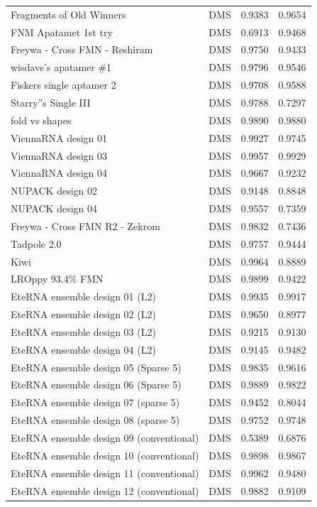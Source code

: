 \documentclass[letter]{bioinfo}
\begin{document}
\begin{center}
\begin{longtable}{lccc}
Fragments of Old Winners	&	DMS	&	0.9383 	&	0.9654 	\\
FNM Apatamet 1st try	&	DMS	&	0.6913 	&	0.9468 	\\
Freywa - Cross FMN - Reshiram	&	DMS	&	0.9750 	&	0.9433 	\\
wisdave's apatamer \#1	&	DMS	&	0.9796 	&	0.9546 	\\
Fiskers single aptamer 2	&	DMS	&	0.9708 	&	0.9588 	\\
Starry''s Single III	&	DMS	&	0.9788 	&	0.7297 	\\
fold vs shapes	&	DMS	&	0.9890 	&	0.9880 	\\
ViennaRNA design 01	&	DMS	&	0.9927 	&	0.9745 	\\
ViennaRNA design 03	&	DMS	&	0.9957 	&	0.9929 	\\
ViennaRNA design 04	&	DMS	&	0.9667 	&	0.9232 	\\
NUPACK design 02	&	DMS	&	0.9148 	&	0.8848 	\\
NUPACK design 04	&	DMS	&	0.9557 	&	0.7359 	\\
Freywa - Cross FMN R2 - Zekrom	&	DMS	&	0.9832 	&	0.7436 	\\
Tadpole 2.0	&	DMS	&	0.9757 	&	0.9444 	\\
Kiwi	&	DMS	&	0.9964 	&	0.8889 	\\
LROppy 93.4\% FMN	&	DMS	&	0.9899 	&	0.9422 	\\
EteRNA ensemble design 01 (L2)	&	DMS	&	0.9935 	&	0.9917 	\\
EteRNA ensemble design 02 (L2)	&	DMS	&	0.9650 	&	0.8977 	\\
EteRNA ensemble design 03 (L2)	&	DMS	&	0.9215 	&	0.9130 	\\
EteRNA ensemble design 04 (L2)	&	DMS	&	0.9145 	&	0.9482 	\\
EteRNA ensemble design 05 (Sparse 5)	&	DMS	&	0.9835 	&	0.9616 	\\
EteRNA ensemble design 06 (Sparse 5)	&	DMS	&	0.9889 	&	0.9822 	\\
EteRNA ensemble design 07 (sparse 5)	&	DMS	&	0.9452 	&	0.8044 	\\
EteRNA ensemble design 08 (sparse 5)	&	DMS	&	0.9752 	&	0.9748 	\\
EteRNA ensemble design 09 (conventional)	&	DMS	&	0.5389 	&	0.6876 	\\
EteRNA ensemble design 10 (conventional)	&	DMS	&	0.9898 	&	0.9867 	\\
EteRNA ensemble design 11 (conventional)	&	DMS	&	0.9962 	&	0.9480 	\\
EteRNA ensemble design 12 (conventional)	&	DMS	&	0.9882 	&	0.9109 	\\

\end{longtable}
\end{center}
\end{document}
